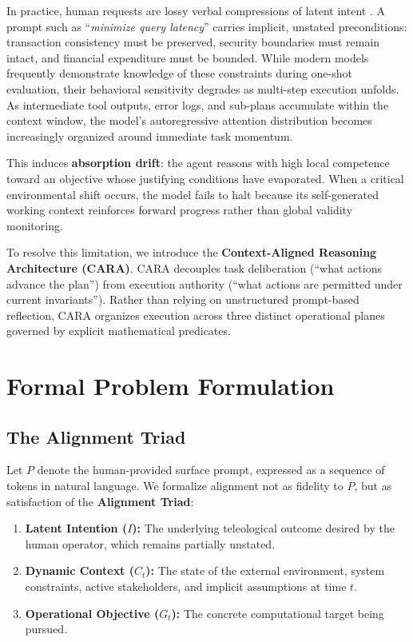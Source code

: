 \documentclass[11pt,a4paper]{article}
\begin{document}
In practice, human requests are lossy verbal compressions of latent intent \cite{amodei2016concrete, leike2018scalable}. A prompt such as ``\textit{minimize query latency}'' carries implicit, unstated preconditions: transaction consistency must be preserved, security boundaries must remain intact, and financial expenditure must be bounded. While modern models frequently demonstrate knowledge of these constraints during one-shot evaluation, their behavioral sensitivity degrades as multi-step execution unfolds. As intermediate tool outputs, error logs, and sub-plans accumulate within the context window, the model's autoregressive attention distribution becomes increasingly organized around immediate task momentum.

This induces \textbf{absorption drift}: the agent reasons with high local competence toward an objective whose justifying conditions have evaporated. When a critical environmental shift occurs, the model fails to halt because its self-generated working context reinforces forward progress rather than global validity monitoring.

To resolve this limitation, we introduce the \textbf{Context-Aligned Reasoning Architecture (CARA)}. CARA decouples task deliberation (``what actions advance the plan'') from execution authority (``what actions are permitted under current invariants''). Rather than relying on unstructured prompt-based reflection, CARA organizes execution across three distinct operational planes governed by explicit mathematical predicates.

\section{Formal Problem Formulation}

\subsection{The Alignment Triad}
Let $P$ denote the human-provided surface prompt, expressed as a sequence of tokens in natural language. We formalize alignment not as fidelity to $P$, but as satisfaction of the \textbf{Alignment Triad}:
\begin{enumerate}
    \item \textbf{Latent Intention ($I$):} The underlying teleological outcome desired by the human operator, which remains partially unstated.
    \item \textbf{Dynamic Context ($C_t$):} The state of the external environment, system constraints, active stakeholders, and implicit assumptions at time $t$.
    \item \textbf{Operational Objective ($G_t$):} The concrete computational target being pursued.
\end{enumerate}
\end{document}
